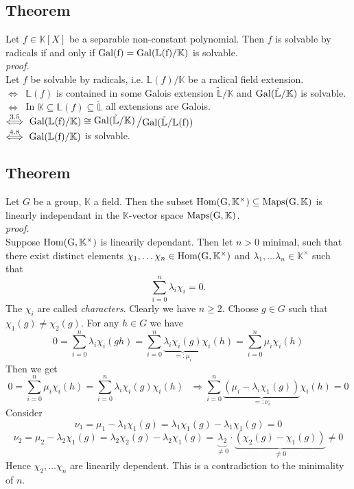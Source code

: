 \documentclass[12pt]{book}
\newcommand{\slant}[2]{{\raisebox{.1em}{$#1$}\left/\raisebox{-.1em}{$#2$}\right.}}
\begin{document}
\begin{spacing}{1.3}
\subsection{Theorem}%
Let $f \in \mathbb{K}[X]$ be a separable non-constant polynomial. Then $f$ is solvable by radicals if and only if $\rm{Gal}(f)=\rm{Gal}(\mathbb{L}(f)/\mathbb{K})$ is solvable.\\
\textit{proof.}\\
Let $f$ be solvable by radicals, i.e. $\mathbb{L}(f)/\mathbb{K}$ be a radical field extension.\\
$\Longleftrightarrow \ $ $\mathbb{L}(f)$ is contained in some Galois extension $\tilde{\mathbb{L}}/\mathbb{K}$ and $\rm{Gal}(\tilde{\mathbb{L}}/\mathbb{K})$ is solvable.\\
$\Longleftrightarrow \ $ In $\mathbb{K}\subseteq \mathbb{L}(f) \subseteq \tilde{\mathbb{L}}$ all extensions are Galois.\\
$\overset{3.5}{\Longleftrightarrow} \ \rm{Gal}(\mathbb{L}(f)/\mathbb{K}) \cong \slant{\rm{Gal}(\tilde{\mathbb{L}}/\mathbb{K})}{\rm{Gal}(\tilde{\mathbb{L}}/\mathbb{L}(f))}$\\
$\overset{4.8}{\Longleftrightarrow} \ \rm{Gal}(\mathbb{L}(f)/\mathbb{K})$ is solvable.

\subsection{Theorem} %
Let $G$ be a group, $\mathbb{K}$ a field. Then the subset $\rm{Hom}(G,\mathbb{K}^{\times}) \subseteq \rm{Maps}(G,\mathbb{K})$ is linearly independant in the $\mathbb{K}$-vector space $\rm{Maps}(G,\mathbb{K})$. \\
\textit{proof.}\\
Suppose $\rm{Hom}(G,\mathbb{K}^{\times})$ is linearily dependant. Then let $n>0$ minimal, such that there exist distinct elements $\chi_1, \dots \chi_n \in \rm{Hom}(G,\mathbb{K}^{\times})$ and $\lambda_1, \dots \lambda_n \in \mathbb{K}^{\times}$ such that
$$ \sum_{i=0}^n \lambda_i \chi_i =0.$$
The $\chi_i$ are called \textit{characters}. Clearly we have $n \geqslant 2$. Choose $g \in G$ such that $\chi_1(g) \neq \chi_2(g)$.
For any $h \in G$ we have
$$0 = \sum_{i=0}^n \lambda_i \chi_i (gh)= \sum_{i=0}^n \underbrace{\lambda_i \chi_i(g)}_{=:\mu_i} \chi_i(h)=\sum_{i=0}^n \mu_i \chi_i(h)$$
Then we get 
$$0 =\sum_{i=0}^n \mu_i \chi_i(h)= \sum_{i=0}^n \lambda_i \chi_i(g)\chi_i(h) \textrm{ } \Rightarrow \sum_{i=0}^n \underbrace{\left(\mu_i-\lambda_i \chi_1(g)\right)}_{=:\nu_i}\chi_i(h)=0$$
Consider
$$\nu_1=\mu_1-\lambda_1 \chi_1(g)=\lambda_1 \chi_1(g)-\lambda_1 \chi_1(g)=0$$
$$\nu_2=\mu_2-\lambda_2 \chi_1(g)=\lambda_2 \chi_2(g)-\lambda_2 \chi_1(g)=\underbrace{\lambda_2}_{\neq 0} \cdot \underbrace{\left(\chi_2(g)-\chi_1(g)\right)}_{\neq 0} \neq 0$$
Hence $\chi_2, \dots \chi_n$ are linearily dependent. This is a contradiction to the minimality of $n$.

\end{spacing}
\end{document}

